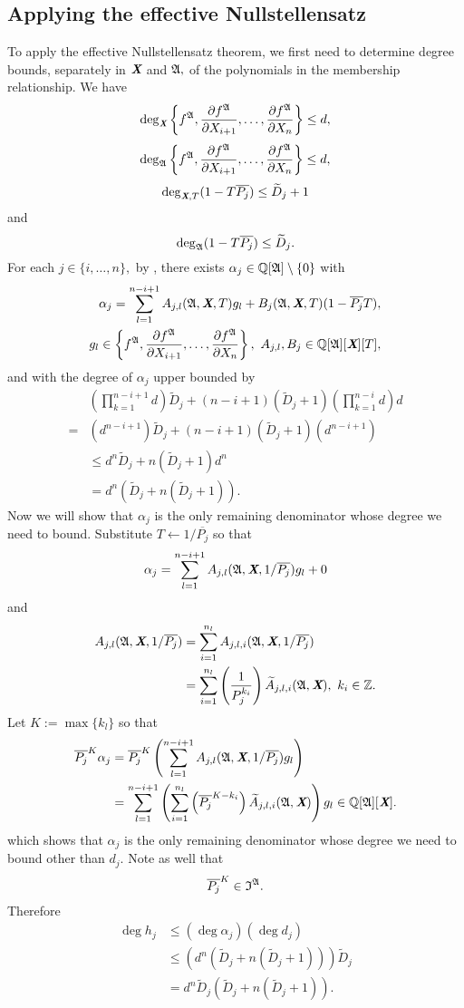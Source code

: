 \documentclass[sigconf]{acmart}
\def\Xb{\textit{\textbf{X}}}
\def\pjb{\overline{P_{j}}}
\def\Q{\mathbb{Q}}
\def\At{\widetilde{A}}
\def\Dt{\widetilde{D}}
\def\I{\frak{I}}
\def\A{\frak{A}}
\begin{document}
\subsection{Applying the effective Nullstellensatz}
%
To apply the effective Nullstellensatz theorem, we first need to determine degree bounds, separately in $\Xb$ and $\A,$ of the polynomials in the membership relationship. We have
\[
\deg_{\Xb}\left\{ 
f^\A,\frac{\partial f^\A}{\partial X_{i+1}},\hdots,\frac{\partial f^\A}{\partial X_n}
\right\}\leq d,
\]
\[
\deg_{\A}  
\left\{ 
f^\A,\frac{\partial f^\A}{\partial X_{i+1}},\hdots,\frac{\partial f^\A}{\partial X_n}
\right\} \leq d,
\]
\[
\deg_{\Xb,T}(1-T\pjb) \leq \Dt_j +1 
\]
and
\[
\deg_{\A}(1-T\pjb) \leq \Dt_j.
\]
For each $j \in \{i,\hdots,n\},$ by \cite[Theorem 0.5]{EN}, there exists $\alpha_j \in \mathbb{Q}[\A]\setminus\{0\}$ with 
%
\begin{align*}
\alpha_j = \sum_{l=1}^{n-i+1} A_{j,l}(\A,\Xb,T)g_l + B_j(\A,\Xb,T)(1-\pjb T), \\ g_l \in 
\left\{ 
f^\A,\frac{\partial f^\A}{\partial X_{i+1}},\hdots,\frac{\partial f^\A}{\partial X_n}
\right\},~ A_{j,l},B_j \in \mathbb{Q}[\A][\Xb][T],
\end{align*}
%
and with the degree of $\alpha_j$ upper bounded by
%
\begin{align*}
    &\left(\prod_{k=1}^{n-i+1} d\right)\Dt_j 
    + (n-i+1)\left(\Dt_j+1\right)\left(\prod_{k=1}^{n-i}d \right)d\\
    = &\left(d^{n-i+1}\right)\Dt_j+
    (n-i+1)\left(\Dt_j+1\right)\left(d^{n-i+1} \right)\\
    &\leq d^{n}\Dt_j + n\left(\Dt_j+1\right)d^{n}\\
    &=d^n\left(\Dt_j + n\left(\Dt_j+1\right) \right).
\end{align*}
%
Now we will show that $\alpha_j$ is the only remaining denominator whose degree we need to bound. Substitute $T \leftarrow 1/\pjb$ so that 
\[
\alpha_j = \sum_{l=1}^{n-i+1} A_{j,l}(\A,\Xb,1/\pjb)g_l + 0
\]
and
%
\begin{align*}
A_{j,l}(\A,\Xb,1/\pjb) 
&= \sum_{i=1}^{n_l} A_{j,l,i}(\A,\Xb,1/\pjb)\\
&= \sum_{i=1}^{n_l} \left(\frac{1}{P_j^{k_i}}\right)\At_{j,l,i}(\A,\Xb), ~k_i \in \mathbb{Z}.
\end{align*}
%
Let $K := \max\{k_l\}$ so that 
%
\begin{align*}
    \pjb^K \alpha_j &= \pjb^K\left(\sum_{l=1}^{n-i+1} A_{j,l}(\A,\Xb,1/\pjb)g_l\right)\\
    &= \sum_{l=1}^{n-i+1}\left( \sum_{i=1}^{n_l}\left(\pjb^{K-k_{i}}\right)\At_{j,l,i}(\A,\Xb) \right)g_l \in \Q[\A][\Xb].
\end{align*}
%
which shows that $\alpha_j$ is the only remaining denominator whose degree we need to bound other than $d_j$. Note as well that
\[
\pjb^K \in \I^{\A}.
\]
Therefore 
%
\begin{align*}
\deg h_j &\leq \left(\deg \alpha_j\right)\left(\deg d_j\right)\\
    &\leq \left(d^n\left(\Dt_j + n\left(\Dt_j+1\right) \right)\right)\Dt_j\\
    &=d^n\Dt_j\left(\Dt_j + n\left(\Dt_j+1\right) \right).
\end{align*}
%
\end{document}
